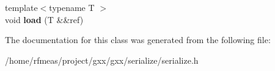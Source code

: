\begin{DoxyCompactItemize}
\item 
{\footnotesize template$<$typename T $>$ }\\void {\bfseries load} (T \&\&ref)\hypertarget{classgxx_1_1archive_1_1binary__deserializer__basic_a3115894844b9d90039b1bd5383d23843}{}\label{classgxx_1_1archive_1_1binary__deserializer__basic_a3115894844b9d90039b1bd5383d23843}

\end{DoxyCompactItemize}


The documentation for this class was generated from the following file\+:\begin{DoxyCompactItemize}
\item 
/home/rfmeas/project/gxx/gxx/serialize/serialize.\+h\end{DoxyCompactItemize}
